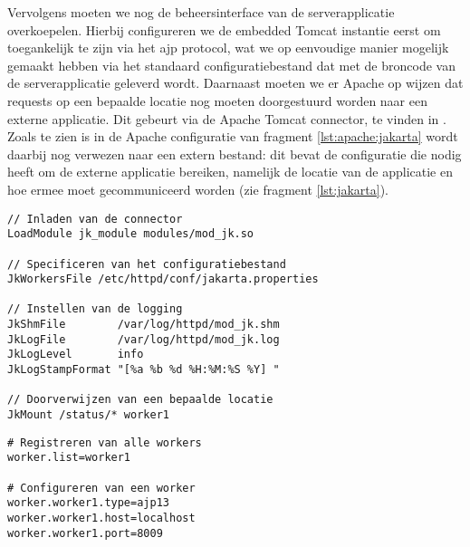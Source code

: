 Vervolgens moeten we nog de beheersinterface van de serverapplicatie overkoepelen. Hierbij configureren we de embedded Tomcat instantie eerst om toegankelijk te zijn via het \ac{ajp} protocol, wat we op eenvoudige manier mogelijk gemaakt hebben via het standaard configuratiebestand dat met de broncode van de serverapplicatie geleverd wordt. Daarnaast moeten we er Apache op wijzen dat requests op een bepaalde locatie nog moeten doorgestuurd worden naar een externe applicatie. Dit gebeurt via de Apache Tomcat connector, te vinden in . Zoals te zien is in de Apache configuratie van fragment \ref{lst:apache:jakarta} wordt daarbij nog verwezen naar een extern bestand: dit bevat de configuratie die  nodig heeft om de externe applicatie bereiken, namelijk de locatie van de applicatie en hoe ermee moet gecommuniceerd worden (zie fragment \ref{lst:jakarta}).

\begin{lstlisting}[language=ApacheConfig, float, caption=Configuratie van Apache om een externe Jakarta applicatie te overkoepelen., label=lst:apache:jakarta]
// Inladen van de connector
LoadModule jk_module modules/mod_jk.so

// Specificeren van het configuratiebestand
JkWorkersFile /etc/httpd/conf/jakarta.properties

// Instellen van de logging
JkShmFile        /var/log/httpd/mod_jk.shm
JkLogFile        /var/log/httpd/mod_jk.log
JkLogLevel       info
JkLogStampFormat "[%a %b %d %H:%M:%S %Y] "

// Doorverwijzen van een bepaalde locatie
JkMount /status/* worker1
\end{lstlisting}

\begin{lstlisting}[language=JavaProperties, float, caption=Configuratie van de Apache Tomcat connector., label=lst:jakarta]
# Registreren van alle workers
worker.list=worker1

# Configureren van een worker
worker.worker1.type=ajp13
worker.worker1.host=localhost
worker.worker1.port=8009
\end{lstlisting}